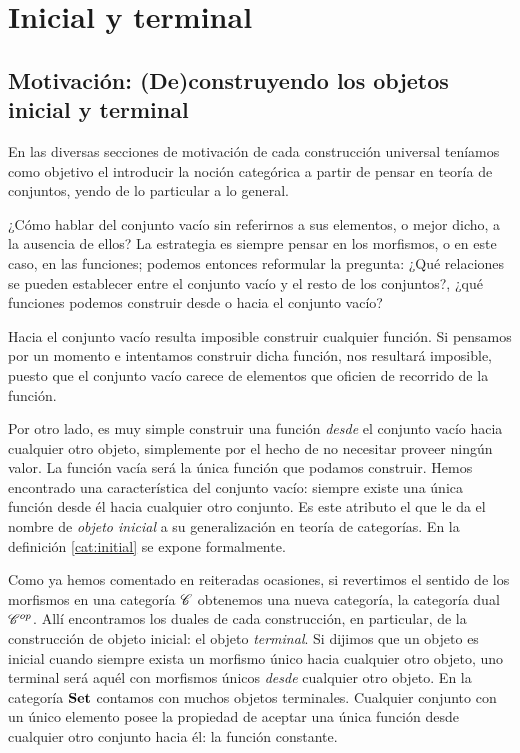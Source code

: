 \section{Inicial y terminal}
\subsection{Motivación: (De)construyendo los objetos inicial y terminal}
\label{mot:initterm}
En las diversas secciones de motivación de cada construcción universal teníamos como objetivo el introducir la noción categórica a partir de pensar en teoría de conjuntos, yendo de lo particular a lo general. 

¿Cómo hablar del conjunto vacío sin referirnos a sus elementos, o mejor dicho, a la ausencia de ellos? La estrategia es siempre pensar en los morfismos, o en este caso, en las funciones; podemos entonces reformular la pregunta: ¿Qué relaciones se pueden establecer entre el conjunto vacío y el resto de los conjuntos?, ¿qué funciones podemos construir desde o hacia el conjunto vacío?

Hacia el conjunto vacío resulta imposible construir cualquier función.
Si pensamos por un momento e intentamos construir dicha función, nos resultará imposible, puesto que el conjunto vacío carece de elementos que oficien de recorrido de la función.

Por otro lado, es muy simple construir una función {\it desde} el conjunto vacío hacia cualquier otro objeto, simplemente por el hecho de no necesitar proveer ningún valor. La función vacía será la única función que podamos construir. Hemos encontrado una característica del conjunto vacío: siempre existe una única función desde él hacia cualquier otro conjunto. Es este atributo el que le da el nombre de {\it objeto inicial}
a su generalización en teoría de categorías. En la definición \ref{cat:initial} se expone formalmente.

Como ya hemos comentado en reiteradas ocasiones, si revertimos el sentido de los morfismos en una categoría $\mathscr{C}$ obtenemos una nueva categoría, la categoría dual $\mathscr{C}^{op}$. Allí encontramos los duales de cada construcción, en particular, de la construcción de objeto inicial: el objeto {\it terminal}. Si dijimos que un objeto es inicial cuando siempre exista un morfismo único hacia cualquier otro objeto, uno terminal será aquél con morfismos únicos {\it desde} cualquier otro objeto. En la categoría $\mathbf{Set}$ contamos con muchos objetos terminales. Cualquier conjunto con un único elemento posee la propiedad de aceptar una única función desde cualquier otro conjunto hacia él: la función constante.


